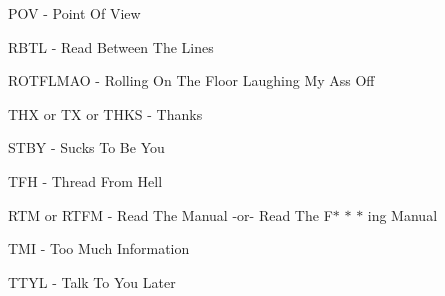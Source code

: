 \documentclass[12pt]{report}
\begin{document}
\begin{adjustwidth}{0.5in}{0.0in}
POV - Point Of View\par

\end{adjustwidth}

\begin{adjustwidth}{0.5in}{0.0in}
RBTL - Read Between The Lines\par

\end{adjustwidth}

\begin{adjustwidth}{0.5in}{0.0in}
ROTFLMAO - Rolling On The Floor Laughing My Ass Off\par

\end{adjustwidth}

\begin{adjustwidth}{0.5in}{0.0in}
THX or TX or THKS - Thanks\par

\end{adjustwidth}

\begin{adjustwidth}{0.5in}{0.0in}
STBY - Sucks To Be You\par

\end{adjustwidth}

\begin{adjustwidth}{0.5in}{0.0in}
TFH - Thread From Hell\par

\end{adjustwidth}

\begin{adjustwidth}{0.5in}{0.0in}
RTM or RTFM - Read The Manual -or- Read The F$\ast$ $\ast$ $\ast$ ing Manual\par

\end{adjustwidth}

\begin{adjustwidth}{0.5in}{0.0in}
TMI - Too Much Information\par

\end{adjustwidth}

\begin{adjustwidth}{0.5in}{0.0in}
TTYL - Talk To You Later\par

\end{adjustwidth}
\end{document}
